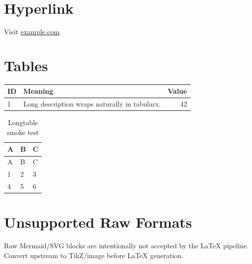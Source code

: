 \documentclass[12pt,a4paper]{article}
\begin{document}
\section{Hyperlink}
Visit \href{https://example.com}{example.com}.
\section{Tables}
\begin{tabularx}{\linewidth}{lXr}\toprule ID & Meaning & Value\\\midrule 1 & Long description wraps naturally in tabularx. & 42\\\bottomrule\end{tabularx}
\begin{longtable}{lll}\caption{Longtable smoke test}\\\toprule A & B & C\\\midrule\endfirsthead\toprule A & B & C\\\midrule\endhead 1 & 2 & 3\\4 & 5 & 6\\\bottomrule\end{longtable}
\section{Unsupported Raw Formats}
Raw Mermaid/SVG blocks are intentionally not accepted by the LaTeX pipeline. Convert upstream to TikZ/image before LaTeX generation.
\end{document}
